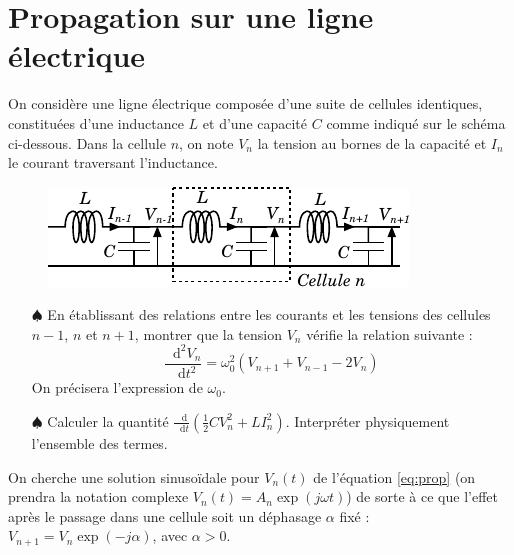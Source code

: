 \documentclass{report}
\newcommand*\dif{\mathop{}\!\mathrm{d}}
\begin{document}
\section*{Propagation sur une ligne électrique}

On considère une ligne électrique composée d'une suite de cellules identiques, constituées d'une inductance $L$ et d'une capacité $C$ comme indiqué sur le schéma ci-dessous. Dans la cellule $n$, on note $V_n$ la tension au bornes de la capacité et $I_n$ le courant traversant  l'inductance.

\begin{figure}[h!]
\centering
	\includegraphics[scale=1.5]{onde3.pdf}
\end{figure}

\begin{itemize}

	\item[$\spadesuit$] En établissant des relations entre les courants et les tensions des cellules $n-1$, $n$ et $n+1$, montrer que la tension $V_n$ vérifie la relation suivante :
	\begin{equation}
		\frac{\dif^2 V_n}{\dif t^2} =\omega_0^2(V_{n+1}+V_{n-1}-2V_n)
		\label{eq:prop}
	\end{equation}
	On précisera l'expression de $\omega_0$.
	
	 \item[$\spadesuit$] Calculer la quantité $\frac{\dif}{\dif t}\left( \frac{1}{2}CV_n^2 + LI_n^2 \right) $. Interpréter physiquement l'ensemble des termes.

\end{itemize}

On cherche une solution sinusoïdale pour $V_n(t)$ de l'équation \ref{eq:prop} (on prendra la notation complexe $V_n(t)=A_n\exp(j\omega t)$) de sorte à ce que l'effet après le passage dans une cellule soit un déphasage $\alpha$ fixé : $V_{n+1}=V_n\exp(-j\alpha)$, avec $\alpha>0$.
\end{document}
